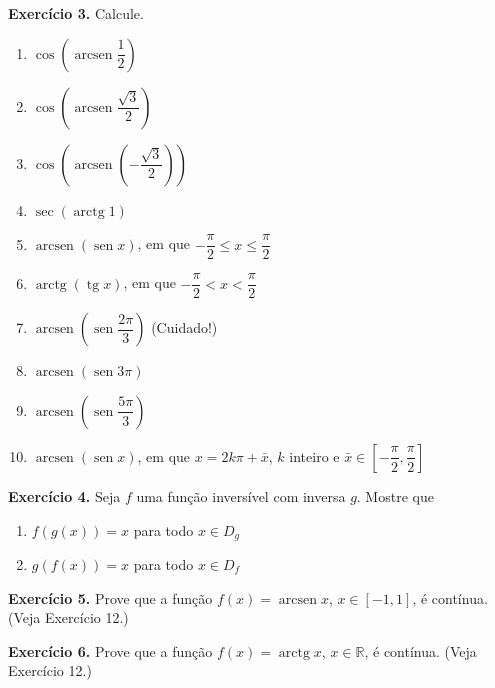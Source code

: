 \documentclass[12pt,a4paper]{article}
\begin{document}
\vspace{0.5cm}
\noindent\textbf{Exercício 3.} Calcule.
\begin{enumerate}
    \renewcommand{\theenumi}{\alph{enumi}}
    \renewcommand{\labelenumi}{\theenumi)}
    \item $\cos \left(\operatorname{arcsen} \dfrac{1}{2}\right)$
    \item $\cos \left(\operatorname{arcsen} \dfrac{\sqrt{3}}{2}\right)$
    \item $\cos \left(\operatorname{arcsen} \left(-\dfrac{\sqrt{3}}{2}\right)\right)$
    \item $\sec (\operatorname{arctg} 1)$
    \item $\operatorname{arcsen} (\operatorname{sen} x)$, em que $-\dfrac{\pi}{2} \le x \le \dfrac{\pi}{2}$
    \item $\operatorname{arctg} (\operatorname{tg} x)$, em que $-\dfrac{\pi}{2} < x < \dfrac{\pi}{2}$
    \item $\operatorname{arcsen} \left(\operatorname{sen} \dfrac{2\pi}{3}\right)$ (Cuidado!)
    \item $\operatorname{arcsen} (\operatorname{sen} 3\pi)$
    \item $\operatorname{arcsen} \left(\operatorname{sen} \dfrac{5\pi}{3}\right)$
    \item $\operatorname{arcsen} (\operatorname{sen} x)$, em que $x = 2k\pi + \bar{x}$, $k$ inteiro e $\bar{x} \in \left[-\dfrac{\pi}{2}, \dfrac{\pi}{2}\right]$
\end{enumerate}

\vspace{0.5cm}
\noindent\textbf{Exercício 4.} Seja $f$ uma função inversível com inversa $g$. Mostre que
\begin{enumerate}
    \renewcommand{\theenumi}{\alph{enumi}}
    \renewcommand{\labelenumi}{\theenumi)}
    \item $f(g(x)) = x$ para todo $x \in D_g$
    \item $g(f(x)) = x$ para todo $x \in D_f$
\end{enumerate}

\vspace{0.5cm}
\noindent\textbf{Exercício 5.}
Prove que a função $f(x) = \operatorname{arcsen} x$, $x \in [-1, 1]$, é contínua. (Veja Exercício 12.)

\vspace{0.5cm}
\noindent\textbf{Exercício 6.}
Prove que a função $f(x) = \operatorname{arctg} x$, $x \in \mathbb{R}$, é contínua. (Veja Exercício 12.)
\end{document}
